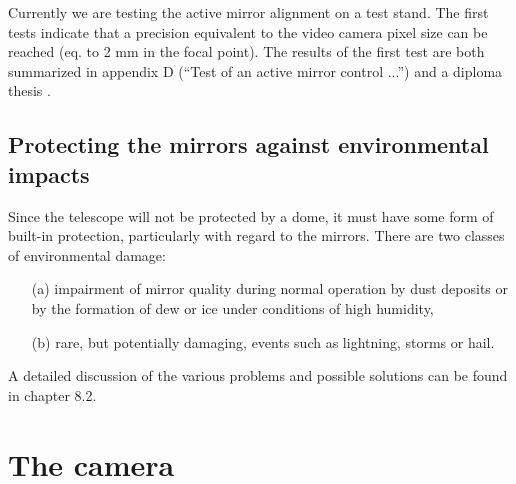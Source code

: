 Currently we are testing the active mirror alignment on a test stand. The
first tests indicate that a precision equivalent to the video camera pixel
size can be reached (eq. to 2 mm in the focal point). The results of the
first test are both summarized in appendix D (``Test of an active mirror control ...'')
and a diploma thesis \cite{wacker:97}.


\subsection{Protecting the mirrors against environmental impacts}


\medskip Since the telescope will not be protected by a dome, it must have
some form of built-in protection, particularly with regard to the mirrors.
There are two classes of environmental damage:

\begin{itemize}
\item[(a)]  impairment of mirror quality during normal operation by dust
deposits or by the formation of dew or ice under conditions of high humidity,

\item[(b)]  rare, but potentially damaging, events such as lightning, storms
or hail.
\end{itemize}

A detailed discussion of the various problems and possible solutions can be
found in chapter 8.2.


\section{The camera}


